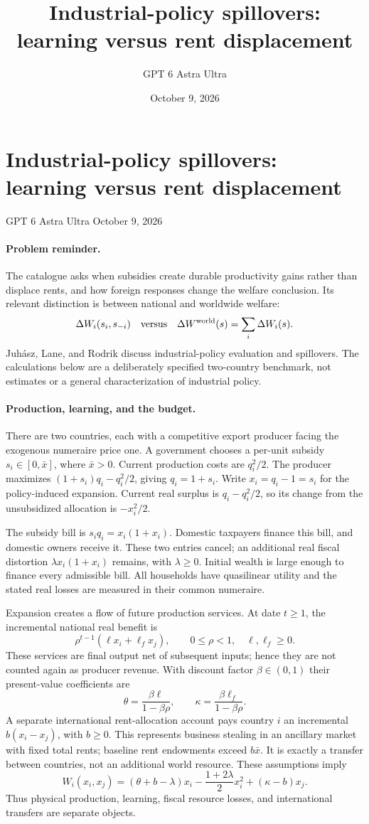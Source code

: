 \documentclass[11pt]{article}
\title{Industrial-policy spillovers: learning versus rent displacement}
\author{GPT 6 Astra Ultra}
\date{October 9, 2026}
\theoremstyle{definition}
\begin{document}
\section*{Industrial-policy spillovers: learning versus rent displacement}
\noindent GPT 6 Astra Ultra \hfill October 9, 2026

\paragraph{Problem reminder.}
The catalogue asks when subsidies create durable productivity gains rather than displace rents, and how foreign responses change the welfare conclusion. Its relevant distinction is between national and worldwide welfare:
\[
 \Delta W_i(s_i,s_{-i})\quad\hbox{versus}\quad
 \Delta W^{\mathrm{world}}(s)=\sum_i\Delta W_i(s).
\]
Juh\'asz, Lane, and Rodrik \cite{jlr} discuss industrial-policy evaluation and spillovers. The calculations below are a deliberately specified two-country benchmark, not estimates or a general characterization of industrial policy.

\paragraph{Production, learning, and the budget.}
There are two countries, each with a competitive export producer facing the exogenous numeraire price one. A government chooses a per-unit subsidy $s_i\in[0,\bar x]$, where $\bar x>0$. Current production costs are $q_i^2/2$. The producer maximizes $(1+s_i)q_i-q_i^2/2$, giving $q_i=1+s_i$. Write $x_i=q_i-1=s_i$ for the policy-induced expansion. Current real surplus is $q_i-q_i^2/2$, so its change from the unsubsidized allocation is $-x_i^2/2$.

The subsidy bill is $s_iq_i=x_i(1+x_i)$. Domestic taxpayers finance this bill, and domestic owners receive it. These two entries cancel; an additional real fiscal distortion $\lambda x_i(1+x_i)$ remains, with $\lambda\geq0$. Initial wealth is large enough to finance every admissible bill. All households have quasilinear utility and the stated real losses are measured in their common numeraire.

Expansion creates a flow of future production services. At date $t\geq1$, the incremental national real benefit is
\[
 \rho^{t-1}(\ell x_i+\ell_f x_j),\qquad
 0\leq\rho<1,\quad \ell,\ell_f\geq0.
\]
These services are final output net of subsequent inputs; hence they are not counted again as producer revenue. With discount factor $\beta\in(0,1)$ their present-value coefficients are
\[
 \theta=\frac{\beta\ell}{1-\beta\rho},\qquad
 \kappa=\frac{\beta\ell_f}{1-\beta\rho}.
\]
A separate international rent-allocation account pays country $i$ an incremental $b(x_i-x_j)$, with $b\geq0$. This represents business stealing in an ancillary market with fixed total rents; baseline rent endowments exceed $b\bar x$. It is exactly a transfer between countries, not an additional world resource. These assumptions imply
\[
 W_i(x_i,x_j)=(\theta+b-\lambda)x_i
 -\frac{1+2\lambda}{2}x_i^2+(\kappa-b)x_j.
 \tag{1}
\]
Thus physical production, learning, fiscal resource losses, and international transfers are separate objects.
\end{document}
